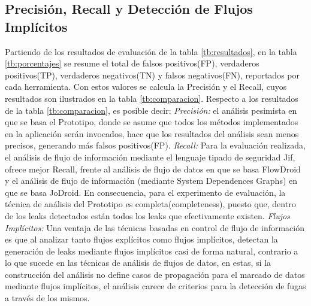 \subsection{Precisión, Recall y Detección de Flujos Implícitos}
Partiendo de los resultados de evaluación de la tabla \ref{tb:resultados}, 
en la tabla \ref{tb:porcentajes} se resume el total de falsos positivos(FP),
verdaderos positivos(TP), verdaderos negativos(TN) y falsos negativos(FN),
reportados por cada herramienta. Con estos valores se calcula la Precisión y el
Recall, cuyos resultados son ilustrados en la tabla
\ref{tb:comparacion}.\newline 
Respecto a los resultados de la tabla \ref{tb:comparacion}, es posible decir: 
\emph{Precisión:} el análisis pesimista en que se basa el Prototipo, donde se
asume que todos los métodos implementados en la aplicación serán invocados, hace que los resultados
del análisis sean menos precisos, generando más falsos positivos(FP).\newline 
\emph{Recall:} Para la evaluación realizada, el análisis de flujo de información
mediante el lenguaje tipado de seguridad Jif, ofrece mejor Recall, frente al análisis
de flujo de datos en que se basa FlowDroid y el análisis de flujo de información
(mediante System Dependences Graphs) en que se basa JoDroid. En consecuencia,
para el experimento de evaluación, la técnica de análisis del Prototipo es
completa(completeness), puesto que, dentro de los leaks detectados están todos
los leaks que efectivamente existen.\newline 
\emph{Flujos Implícitos:} Una ventaja de las técnicas basadas en control de
flujo de información es que al analizar tanto flujos explícitos como flujos implícitos,
detectan la generación de leaks mediante flujos implícitos casi de forma
natural, contrario a lo que sucede en las técnicas de análisis de flujos de
datos, en estas, si la construcción del análisis no define casos de propagación
para el marcado de datos mediante flujos implícitos, el análisis carece de
criterios para la detección de fugas a través de los mismos.\newline
\begin{table}[t]
\begin{center}
\small
{}
\end{center}
\caption{Resultados de precisión para FlowDroid y Prototipo. Resume el total de
FP, TP, TN y FN}
\label{tb:porcentajes}
\end{table}

